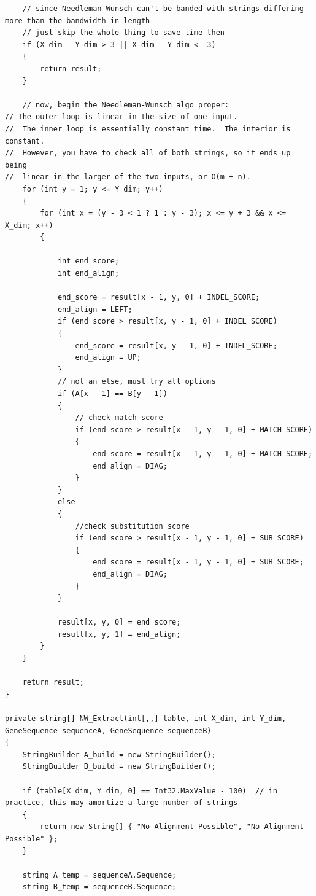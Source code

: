 \documentclass{article}
\begin{document}
\begin{itemize}
\begin{lstlisting}
    // since Needleman-Wunsch can't be banded with strings differing more than the bandwidth in length
    // just skip the whole thing to save time then
    if (X_dim - Y_dim > 3 || X_dim - Y_dim < -3)
    {
        return result;
    }

    // now, begin the Needleman-Wunsch algo proper: 
// The outer loop is linear in the size of one input.  
//	The inner loop is essentially constant time.  The interior is constant.
//  However, you have to check all of both strings, so it ends up being
//	linear in the larger of the two inputs, or O(m + n).
    for (int y = 1; y <= Y_dim; y++)
    {
        for (int x = (y - 3 < 1 ? 1 : y - 3); x <= y + 3 && x <= X_dim; x++)
        {

            int end_score;
            int end_align;

            end_score = result[x - 1, y, 0] + INDEL_SCORE;
            end_align = LEFT;
            if (end_score > result[x, y - 1, 0] + INDEL_SCORE)
            {
                end_score = result[x, y - 1, 0] + INDEL_SCORE;
                end_align = UP;
            }
            // not an else, must try all options
            if (A[x - 1] == B[y - 1])
            {
                // check match score
                if (end_score > result[x - 1, y - 1, 0] + MATCH_SCORE)
                {
                    end_score = result[x - 1, y - 1, 0] + MATCH_SCORE;
                    end_align = DIAG;
                }
            }
            else
            {
                //check substitution score
                if (end_score > result[x - 1, y - 1, 0] + SUB_SCORE)
                {
                    end_score = result[x - 1, y - 1, 0] + SUB_SCORE;
                    end_align = DIAG;
                }
            }

            result[x, y, 0] = end_score;
            result[x, y, 1] = end_align;
        }
    }

    return result;
}

private string[] NW_Extract(int[,,] table, int X_dim, int Y_dim, GeneSequence sequenceA, GeneSequence sequenceB)
{
    StringBuilder A_build = new StringBuilder();
    StringBuilder B_build = new StringBuilder();

    if (table[X_dim, Y_dim, 0] == Int32.MaxValue - 100)  // in practice, this may amortize a large number of strings
    {
        return new String[] { "No Alignment Possible", "No Alignment Possible" };
    }

    string A_temp = sequenceA.Sequence;
    string B_temp = sequenceB.Sequence;


\end{lstlisting}
\end{itemize}
\end{document}
